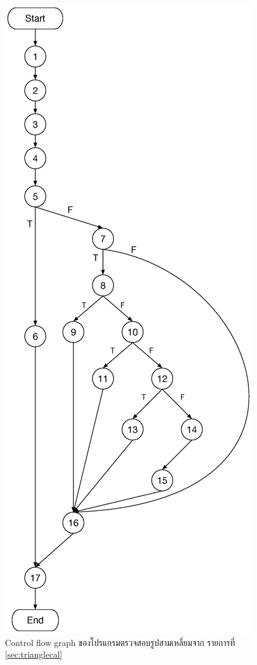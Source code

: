\documentclass[12pt,a4paper]{article}
\renewcommand{\lstlistingname}{รายการที่}
\begin{document}
\begin{figure}[h!]
    \label{fig:flowgraph}
    \centering
    \includegraphics[height=0.8\textheight]{img/graph-testing-pythagorus.eps}
    \caption{Control flow graph ของโปรแกรมตรวจสอบรูปสามเหลี่ยมจาก \lstlistingname\, \ref{sec:trianglecal}}
\end{figure}
\end{document}
